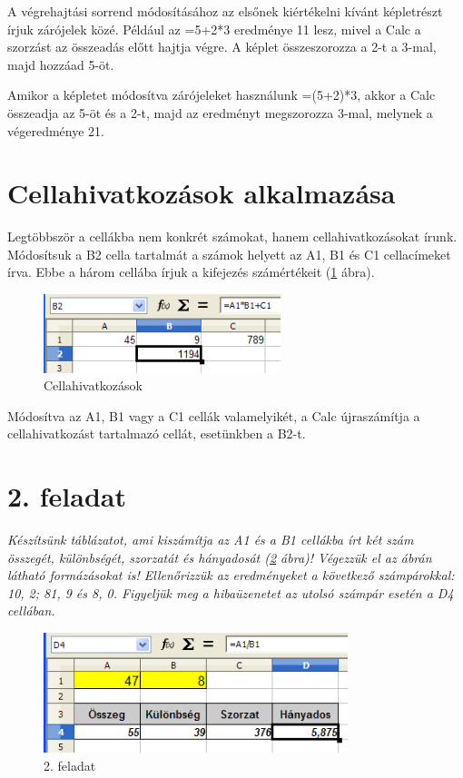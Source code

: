A végrehajtási sorrend módosításához az elsőnek
kiértékelni kívánt képletrészt írjuk zárójelek
közé. Például az =5+2*3 eredménye 11 lesz, mivel a Calc a
szorzást az összeadás előtt hajtja végre. A képlet
összeszorozza a 2-t a 3-mal, majd hozzáad 5-öt.

Amikor a képletet módosítva zárójeleket használunk =(5+2)*3,
akkor a Calc összeadja az 5-öt és a 2-t, majd az eredményt
megszorozza 3-mal, melynek a végeredménye 21.

\section{Cellahivatkozások alkalmazása}

Legtöbbször a cellákba nem konkrét számokat, hanem
cellahivatkozásokat írunk. Módosítsuk a B2 cella tartalmát a
számok helyett az A1, B1 és C1 cellacímeket írva. Ebbe a
három cellába írjuk a kifejezés számértékeit (\ref{Cellahivatkozások}
ábra).

\begin{figure}[!h]
\begin{center}
\includegraphics[width=6.909cm]{oocalcv2-img21.png}
\caption{Cellahivatkozások}\label{Cellahivatkozások}
\end{center}
\end{figure}
Módosítva az A1, B1 vagy a C1 cellák valamelyikét, a Calc
újraszámítja a cellahivatkozást tartalmazó cellát,
esetünkben a B2-t.

\section{2. feladat}
{\itshape
Készítsünk táblázatot, ami kiszámítja az A1 és a B1
cellákba írt két szám összegét, különbségét,
szorzatát és hányadosát (\ref{2-feladat} ábra)! Végezzük el az
ábrán látható formázásokat is! Ellenőrizzük az
eredményeket a következő számpárokkal: 10, 2; 81, 9 és 8,
0. Figyeljük meg a hibaüzenetet az utolsó számpár esetén a
D4 cellában. }


\begin{figure}[!h]
\begin{center}
\includegraphics[width=8.867cm]{oocalcv2-img22.png}
\caption{2. feladat}\label{2-feladat}
\end{center}
\end{figure}

